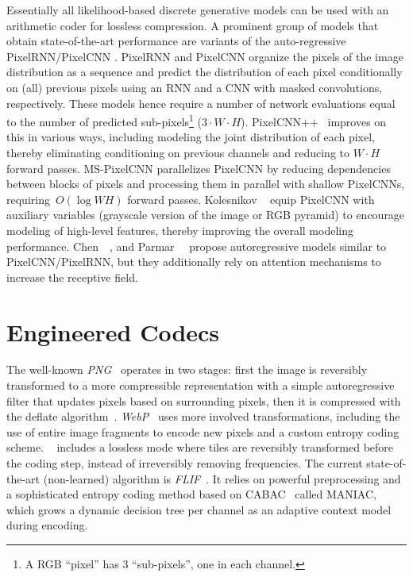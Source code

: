 Essentially all likelihood-based discrete generative models can be used with an
arithmetic coder for lossless compression. A prominent group of models that
obtain state-of-the-art performance are variants of the auto-regressive
PixelRNN/PixelCNN \cite{van2016pixel, van2016conditional}. PixelRNN and
PixelCNN organize the pixels of the image distribution as a sequence and
predict the distribution of each pixel conditionally on (all) previous pixels
using an RNN and a CNN with masked convolutions, respectively. These models
hence require a number of network evaluations equal to the number of predicted
sub-pixels\footnote{\label{l3c:fn:subpixel}A RGB ``pixel'' has 3
``sub-pixels'', one in each channel.} ($3\cdot\! W\!\cdot\! H$).
PixelCNN++~\cite{Salimans2017pcnnpp} improves on this in various ways,
including modeling the joint distribution of each pixel, thereby eliminating
conditioning on previous channels and reducing to $W\!\cdot\! H$ forward
passes. 
MS-PixelCNN \cite{reed2017parallel} parallelizes PixelCNN by reducing
dependencies between blocks of pixels and processing them in parallel with
shallow PixelCNNs, requiring~$O(\log WH)$ forward passes.
Kolesnikov \etal~\cite{kolesnikov2017pixelcnn} equip PixelCNN with auxiliary variables
(grayscale version of the image or RGB pyramid) to encourage modeling of
high-level features, thereby improving the overall modeling performance.
Chen~\etal~\cite{chen2017pixelsnail}, and Parmar~\etal~\cite{parmar2018image}
propose autoregressive models similar to PixelCNN/PixelRNN, but they
additionally rely on attention mechanisms to increase the receptive field.

\section{Engineered Codecs} \label{rel:sec:engineered}

The well-known \emph{PNG}~\cite{pngurl} operates in
two stages: first the image is reversibly transformed to a more compressible
representation with a simple autoregressive filter that updates pixels based on
surrounding pixels, then it is compressed with the deflate
algorithm~\cite{deutsch1996deflate}.  \emph{WebP}~\cite{webpurl} uses more
involved transformations, including the use of entire image fragments to encode
new pixels and a custom entropy coding scheme.
\emph{\jpegk}~\cite{jpeg2000taubman} includes a lossless mode where tiles
are reversibly transformed before the coding step, instead of irreversibly
removing frequencies.  The current state-of-the-art (non-learned) algorithm is
\emph{FLIF}~\cite{flif2016}. It relies on powerful preprocessing and a
sophisticated entropy coding method based on CABAC~\cite{richardson2004h}
called MANIAC, which grows a dynamic decision tree per channel as an adaptive
context model during encoding.

